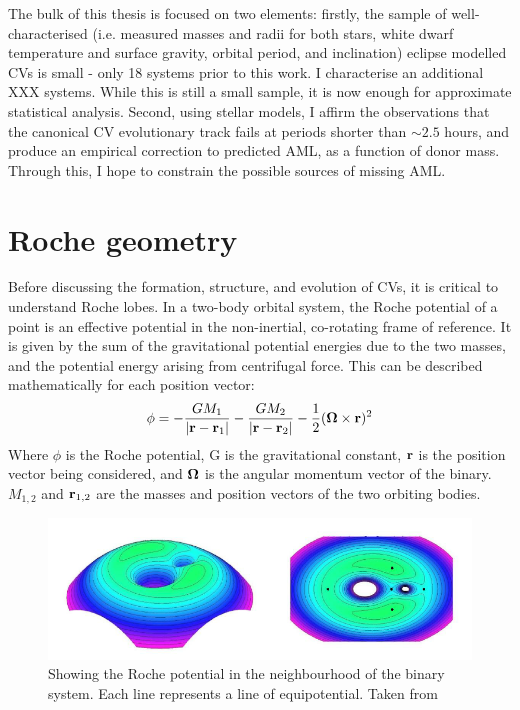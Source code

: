 The bulk of this thesis is focused on two elements: firstly, the sample of well-characterised (i.e. measured masses and radii for both stars, white dwarf temperature and surface gravity, orbital period, and inclination) eclipse modelled CVs is small - only 18 systems prior to this work. I characterise an additional XXX systems. While this is still a small sample, it is now enough for approximate statistical analysis. Second, using stellar models, I affirm the observations that the canonical CV evolutionary track fails at periods shorter than $\sim 2.5$ hours, and produce an empirical correction to predicted AML, as a function of donor mass. Through this, I hope to constrain the possible sources of missing AML. 

\section{Roche geometry}
\label{sect:introduction:Roche geometry}

Before discussing the formation, structure, and evolution of CVs, it is critical to understand Roche lobes.
In a two-body orbital system, the Roche potential of a point is an effective potential in the non-inertial, co-rotating frame of reference. It is given by the sum of the gravitational potential energies due to the two masses, and the potential energy arising from centrifugal force. This can be described mathematically for each position vector:
\begin{equation}
    {\bf \phi} = -\frac{G M_1}{|{\bf r - r}_1|} - \frac{G M_2}{|{\bf r - r}_2|} - \frac{1}{2}({\bf \Omega} \times {\bf r})^2
\end{equation}
Where $\phi$ is the Roche potential, G is the gravitational constant, $\bf r$ is the position vector being considered, and $\bf \Omega$ is the angular momentum vector of the binary. $M_{1,2}$ and ${\bf r}_{1,2}$ are the masses and position vectors of the two orbiting bodies.

\begin{figure}
    \centering
    \includegraphics[width=\columnwidth, trim={0mm 0mm 380px 0mm}, clip]{figures/introduction/roche.png}
    \caption{Showing the Roche potential in the neighbourhood of the binary system. Each line represents a line of equipotential. Taken from \citet{cerutti2007}}
    \label{fig:roche}
\end{figure}

